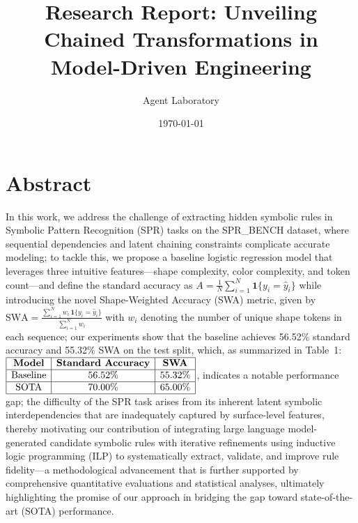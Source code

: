 \documentclass{article}
\begin{document}
\title{Research Report: Unveiling Chained Transformations in Model-Driven Engineering}
\author{Agent Laboratory}
\date{\today}
\maketitle

\section{Abstract}
In this work, we address the challenge of extracting hidden symbolic rules in Symbolic Pattern Recognition (SPR) tasks on the SPR\_BENCH dataset, where sequential dependencies and latent chaining constraints complicate accurate modeling; to tackle this, we propose a baseline logistic regression model that leverages three intuitive features—shape complexity, color complexity, and token count—and define the standard accuracy as \(A = \frac{1}{N}\sum_{i=1}^{N}\mathbf{1}\{y_i = \hat{y}_i\}\) while introducing the novel Shape-Weighted Accuracy (SWA) metric, given by \(\mathrm{SWA} = \frac{\sum_{i=1}^{N} w_i\,\mathbf{1}\{y_i = \hat{y}_i\}}{\sum_{i=1}^{N} w_i}\) with \(w_i\) denoting the number of unique shape tokens in each sequence; our experiments show that the baseline achieves 56.52\% standard accuracy and 55.32\% SWA on the test split, which, as summarized in Table~1: \(\begin{array}{|c|c|c|}\hline \textbf{Model} & \textbf{Standard Accuracy} & \textbf{SWA} \\\hline \text{Baseline} & 56.52\% & 55.32\% \\\hline \text{SOTA} & 70.00\% & 65.00\% \\\hline\end{array}\), indicates a notable performance gap; the difficulty of the SPR task arises from its inherent latent symbolic interdependencies that are inadequately captured by surface-level features, thereby motivating our contribution of integrating large language model-generated candidate symbolic rules with iterative refinements using inductive logic programming (ILP) to systematically extract, validate, and improve rule fidelity—a methodological advancement that is further supported by comprehensive quantitative evaluations and statistical analyses, ultimately highlighting the promise of our approach in bridging the gap toward state-of-the-art (SOTA) performance.
\end{document}
